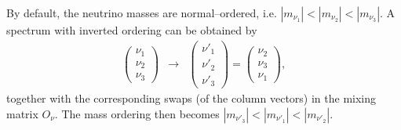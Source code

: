 \documentclass[pdflatex,final,3p,times]{elsarticle}
\begin{document}
By default, the
neutrino masses are normal--ordered,
i.e. $|m_{\nu_1}|<|m_{\nu_2}|<|m_{\nu_3}|$.  A spectrum with inverted
ordering can be obtained by
\begin{eqnarray}
\left ( \begin{array}{c}
\nu_1 \\ \nu_2 \\ \nu_3 \end{array} \right ) &\to&
\left ( \begin{array}{c}
\nu'_1 \\ \nu'_2 \\ \nu'_3 \end{array} \right ) = 
\left ( \begin{array}{c}
\nu_2 \\ \nu_3 \\ \nu_1 \end{array} \right ),
\end{eqnarray}
together with the corresponding swaps (of the column vectors) in the
mixing matrix $O_{\nu}$.  The mass ordering then becomes
$|m_{\nu'_3}|<|m_{\nu'_1}|<|m_{\nu'_2}|$.
\end{document}
